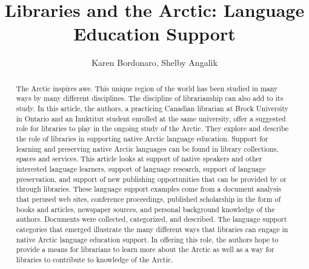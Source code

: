 \documentclass[a4paper,
fontsize=11pt,
oneside,
numbers=noperiodatend,
parskip=half-,
bibliography=totoc,
final
]{scrartcl}
\title{\LARGE{Libraries and the Arctic: Language Education Support}} %
\author{Karen Bordonaro, Shelby Angalik} %
\date{}
\begin{document}
\maketitle
\thispagestyle{fancyplain} 

\begin{abstract}
The Arctic inspires awe. This unique region of the world has been
studied in many ways by many different disciplines. The discipline of
librarianship can also add to its study. In this article, the authors, a
practicing Canadian librarian at Brock University in Ontario and an
Inuktitut student enrolled at the same university, offer a suggested
role for libraries to play in the ongoing study of the Arctic. They
explore and describe the role of libraries in supporting native Arctic
language education. Support for learning and preserving native Arctic
languages can be found in library collections, spaces and services. This
article looks at support of native speakers and other interested
language learners, support of language research, support of language
preservation, and support of new publishing opportunities that can be
provided by or through libraries. These language support examples come
from a document analysis that perused web sites, conference proceedings,
published scholarship in the form of books and articles, newspaper
sources, and personal background knowledge of the authors. Documents
were collected, categorized, and described. The language support
categories that emerged illustrate the many different ways that
libraries can engage in native Arctic language education support. In
offering this role, the authors hope to provide a means for librarians
to learn more about the Arctic as well as a way for libraries to
contribute to knowledge of the Arctic.\\


\end{abstract}
\end{document}
